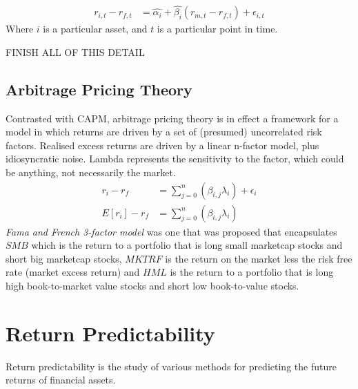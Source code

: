 \documentclass[a4paper]{article}
\begin{document}
\begin{align*}
r_{i,t} - r_{f,t} &= \widehat{\alpha_i} + \widehat{\beta_i}(r_{m,t} - r_{f,t}) + \epsilon_{i,t}
\end{align*}
Where $i$ is a particular asset, and $t$ is a particular point in time.

FINISH ALL OF THIS DETAIL

\subsection{Arbitrage Pricing Theory}
Contrasted with CAPM, arbitrage pricing theory is in effect a framework for a
model in which returns are driven by a set of (presumed) uncorrelated risk
factors. Realised excess returns are driven by a linear n-factor
model, plus idiosyncratic noise. Lambda represents the sensitivity
to the factor, which could be anything, not necessarily the market.
\begin{align*}
r_i - r_f &= \sum_{j=0}^{n} (\beta_{i,j} \lambda_i) + \epsilon_i \\
E[r_i] - r_f &= \sum_{j=0}^{n} (\beta_{i,j} \lambda_i)
\end{align*}
\emph{Fama and French 3-factor model} was one that was proposed that encapsulates
$SMB$ which is the return to a portfolio that is long small marketcap stocks
and short big marketcap stocks, $MKTRF$ is the return on the market less the risk
free rate (market excess return) and $HML$ is the return to a portfolio that
is long high book-to-market value stocks and short low book-to-value stocks.

\section{Return Predictability}
Return predictability is the study of various methods for predicting the future
returns of financial assets.
\end{document}

